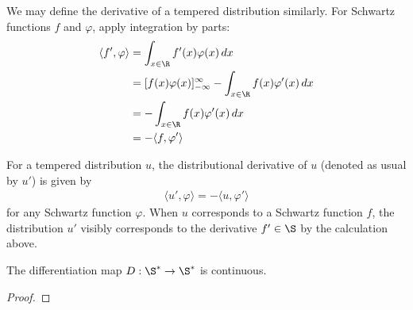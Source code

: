   We may define the derivative of a tempered distribution similarly.
  For Schwartz functions $f$ and $\varphi$, apply integration by parts:
  \begin{align*}
    \langle f', \varphi\rangle
    &= \int_{x\in\R} f'(x)\varphi(x)\,dx
    \\&= [f(x)\varphi(x)]_{-\infty}^\infty -\int_{x\in\R} f(x)\varphi'(x)\,dx
    \\&= -\int_{x\in\R} f(x)\varphi'(x)\,dx
    \\&= -\langle f,\varphi'\rangle
  \end{align*}
  \begin{defn}
    For a tempered distribution $u$, the distributional derivative of $u$ (denoted as usual by $u'$) is given by
    \begin{align*}
      \langle u', \varphi\rangle = -\langle u, \varphi'\rangle
    \end{align*}
    for any Schwartz function $\varphi$.
    When $u$ corresponds to a Schwartz function $f$, the distribution $u'$ visibly corresponds to the derivative $f'\in\S$ by the calculation above. 
  \end{defn}

  \begin{claim}
    The differentiation map $D:\S^*\rightarrow\S^*$ is continuous.
  \end{claim}
  \begin{proof}
    
  \end{proof}



